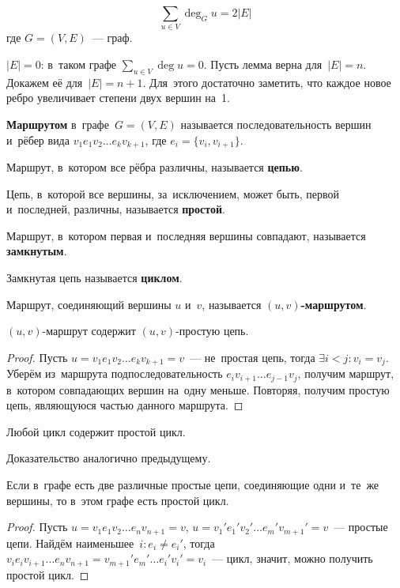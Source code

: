 \begin{lemma}[о рукопожатиях]
	\[ \sum_{u \in V} \deg_G u = 2|E| \]
	где $G = (V, E)$~--- граф.
\end{lemma}
\begin{proofmathind}
	\indbase $|E| = 0$: в~таком графе $\displaystyle \sum_{u \in V} \deg u = 0$.
	\indstep Пусть лемма верна для~$|E| = n$.
	Докажем её для~$|E| = n + 1$.
	Для~этого достаточно заметить, что каждое новое ребро увеличивает степени двух вершин на~1.
	\indend
\end{proofmathind}


\textbf{Маршрутом} в~графе~$G = (V, E)$ называется последовательность вершин и~рёбер вида $v_1 e_1 v_2 \ldots e_k v_{k+1}$, где $e_i = \{ v_i, v_{i+1} \}$.

Маршрут, в~котором все рёбра различны, называется \textbf{цепью}.

Цепь, в~которой все вершины, за~исключением, может быть, первой и~последней, различны, называется \textbf{простой}.

Маршрут, в~котором первая и~последняя вершины совпадают, называется \textbf{замкнутым}.

Замкнутая цепь называется \textbf{циклом}.

Маршрут, соединяющий вершины $u$ и~$v$, называется \textbf{$(u, v)$\nobreakdash-\hspace{0pt}маршрутом}.

\begin{lemma}
	$(u, v)$\nobreakdash-\hspace{0pt}маршрут содержит $(u, v)$\nobreakdash-\hspace{0pt}простую цепь.
\end{lemma}
\begin{proof}
	Пусть $u = v_1 e_1 v_2 \ldots e_k v_{k+1} = v$~--- не~простая цепь, тогда $\exists i < j \colon v_i = v_j$.
	Уберём из~маршрута подпоследовательность $e_i v_{i+1} \ldots e_{j-1} v_j$, получим маршрут, в~котором совпадающих вершин на~одну меньше.
	Повторяя, получим простую цепь, являющуюся частью данного маршрута.
\end{proof}

\begin{lemma}
	Любой цикл содержит простой цикл.
\end{lemma}%
Доказательство аналогично предыдущему.

\begin{lemma}
	Если в~графе есть две различные простые цепи, соединяющие одни и~те~же вершины, то в~этом графе есть простой цикл.
\end{lemma}
\begin{proof}
	Пусть $u = v_1 e_1 v_2 \ldots e_n v_{n+1} = v$, $u = v_1' e_1' v_2' \ldots e_m' v_{m+1}' = v$~--- простые цепи.
	Найдём наименьшее~$i \colon e_i \neq e_i'$, тогда $v_i e_i v_{i+1} \ldots e_n v_{n+1} = v_{m+1}' e_m' \ldots e_i' v_i' = v_i$~--- цикл, значит, можно получить простой цикл.
\end{proof}

